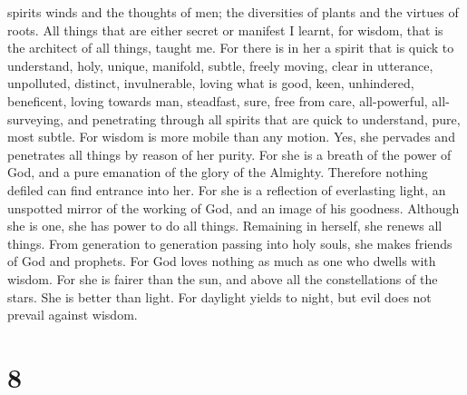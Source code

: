 spirits winds and the thoughts of men; the diversities of plants and the
virtues of roots.  All things that are either secret or
manifest I learnt,  for wisdom, that is the architect of
all things, taught me. For there is in her a spirit that is quick to
understand, holy, unique, manifold, subtle, freely moving, clear in
utterance, unpolluted, distinct, invulnerable, loving what is good,
keen, unhindered,  beneficent, loving towards man,
steadfast, sure, free from care, all-powerful, all-surveying, and
penetrating through all spirits that are quick to understand, pure, most
subtle.  For wisdom is more mobile than any motion. Yes,
she pervades and penetrates all things by reason of her purity.
 For she is a breath of the power of God, and a pure
emanation of the glory of the Almighty. Therefore nothing defiled can
find entrance into her.  For she is a reflection of
everlasting light, an unspotted mirror of the working of God, and an
image of his goodness.  Although she is one, she has power
to do all things. Remaining in herself, she renews all things. From
generation to generation passing into holy souls, she makes friends of
God and prophets.  For God loves nothing as much as one who
dwells with wisdom.  For she is fairer than the sun, and
above all the constellations of the stars. She is better than light.
 For daylight yields to night, but evil does not prevail
against wisdom.

\hypertarget{section-6}{%
\section{8}\label{section-6}}

